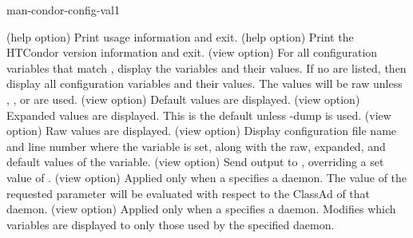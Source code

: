 \begin{ManPage}{}{man-condor-config-val}{1}
\begin{Options}
   {(help option) 
    Print usage information and exit.
   }
   {(help option) 
    Print the HTCondor version information and exit.
   }
   {(view option)
    For all configuration variables that match , display the variables and their values.
    If no  are listed, then display all configuration variables and their values.
    The values will be raw unless , , or  are used.
   }
   {(view option)
    Default values are displayed.
   }
   {(view option)
    Expanded values are displayed.  This is the default unless -dump is used.
   }
   {(view option)
    Raw values are displayed.
   }
   {(view option)
    Display configuration file name and line number where the variable is
    set, along with the raw, expanded, and default values of the variable.
   }
   {(view option)
    Send output to ,
    overriding a set value of . 
   }
   {(view option)
    Applied only when a  specifies a daemon.
    The value of the requested parameter will be evaluated with 
    respect to the ClassAd of that daemon.
   }
   {(view option)
    Applied only when a  specifies a daemon.
    Modifies which variables are displayed to only those 
    used by the specified daemon.
   }

\end{Options}
\end{ManPage}

